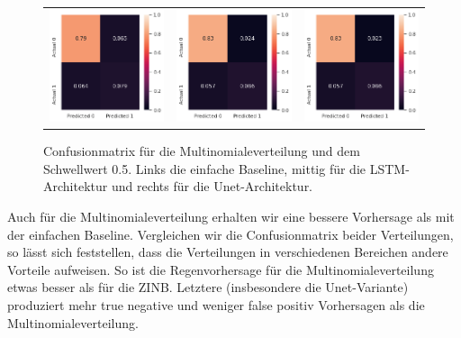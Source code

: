\begin{figure}[h]
\begin{tabular}{ccc}
\includegraphics[width=45mm]{abb/simpleBaseLine.png}&
\includegraphics[width=45mm]{abb/categoricalConfusion_LSTM.png}&
\includegraphics[width=45mm]{abb/categoricalConfusion_UNET.png}
\end{tabular}
\caption{Confusionmatrix für die Multinomialeverteilung und dem Schwellwert 0.5. Links die einfache Baseline, mittig für die LSTM-Architektur und rechts für die Unet-Architektur. \label{fig:confusionmatrix_cat}}
\end{figure}

\noindent Auch für die Multinomialeverteilung erhalten wir eine bessere Vorhersage als mit der einfachen Baseline.
Vergleichen wir die Confusionmatrix beider Verteilungen, so lässt sich feststellen, dass die Verteilungen in verschiedenen Bereichen andere Vorteile aufweisen.
So ist die Regenvorhersage für die Multinomialeverteilung etwas besser als für die ZINB. Letztere (insbesondere die Unet-Variante) produziert mehr true negative und weniger false positiv Vorhersagen als die Multinomialeverteilung.\\

